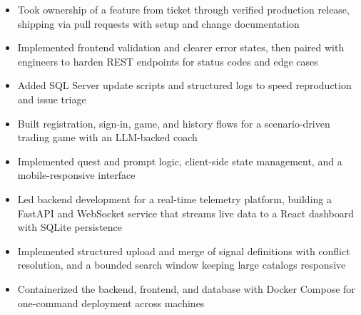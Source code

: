 \documentclass[10pt,letterpaper]{article}
\begin{document}
\entryspace

\begin{itemize}
  \item Took ownership of a feature from ticket through verified production release, shipping via pull requests with setup and change documentation
  \item Implemented frontend validation and clearer error states, then paired with engineers to harden REST endpoints for status codes and edge cases
  \item Added SQL Server update scripts and structured logs to speed reproduction and issue triage
\end{itemize}


\begin{itemize}
  \item Built registration, sign-in, game, and history flows for a scenario-driven trading game with an LLM-backed coach
  \item Implemented quest and prompt logic, client-side state management, and a mobile-responsive interface
\end{itemize}

\entryspace

\begin{itemize}
  \item Led backend development for a real-time telemetry platform, building a FastAPI and WebSocket service that streams live data to a React dashboard with SQLite persistence
  \item Implemented structured upload and merge of signal definitions with conflict resolution, and a bounded search window keeping large catalogs responsive
  \item Containerized the backend, frontend, and database with Docker Compose for one-command deployment across machines
\end{itemize}
\end{document}
